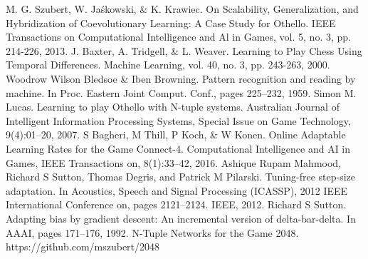 \documentclass{suribt}
\begin{document}
\begin{thebibliography}{}
  M. G. Szubert, W. Ja\'{s}kowski, \& K. Krawiec. On Scalability, Generalization, and Hybridization of Coevolutionary Learning: A Case Study for Othello. IEEE Transactions on Computational Intelligence and Al in Games, vol. 5, no. 3, pp. 214-226, 2013.
  J. Baxter, A. Tridgell, \& L. Weaver. Learning to Play Chess Using Temporal Differences. Machine Learning, vol. 40, no. 3, pp. 243-263, 2000.
  Woodrow Wilson Bledsoe \& Iben Browning. Pattern recognition and reading by machine. In Proc. Eastern Joint Comput. Conf., pages 225–232, 1959.
  Simon M. Lucas. Learning to play Othello with N-tuple systems. Australian Journal of Intelligent Information Processing Systems, Special Issue on Game Technology, 9(4):01–20, 2007.
  S Bagheri, M Thill, P Koch, \& W Konen. Online Adaptable Learning Rates for the Game Connect-4. Computational Intelligence and AI in Games, IEEE Transactions on, 8(1):33–42, 2016.
  Ashique Rupam Mahmood, Richard S Sutton, Thomas Degris, and Patrick M Pilarski. Tuning-free step-size adaptation. In Acoustics, Speech and Signal Processing (ICASSP), 2012 IEEE International Conference on, pages 2121–2124. IEEE, 2012.
  Richard S Sutton. Adapting bias by gradient descent: An incremental version of delta-bar-delta. In AAAI, pages 171–176, 1992.
  N-Tuple Networks for the Game 2048. https://github.com/mszubert/2048
\end{thebibliography}
\end{document}
